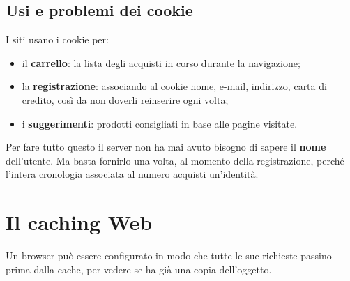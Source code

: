 \subsection{Usi e problemi dei cookie}

I siti usano i cookie per:

\begin{itemize}
    \item il \textbf{carrello}: la lista degli acquisti in corso durante la navigazione;
    \item la \textbf{registrazione}: associando al cookie nome, e-mail, indirizzo, carta di credito, così da
          non doverli reinserire ogni volta;
    \item i \textbf{suggerimenti}: prodotti consigliati in base alle pagine visitate.
\end{itemize}

Per fare tutto questo il server non ha mai avuto bisogno di sapere il \textbf{nome} dell'utente. Ma basta
fornirlo una volta, al momento della registrazione, perché l'intera cronologia associata al numero
acquisti un'identità.


\section{Il caching Web}


Un browser può essere configurato in modo che tutte le sue richieste passino prima dalla cache, per
vedere se ha già una copia dell'oggetto.

